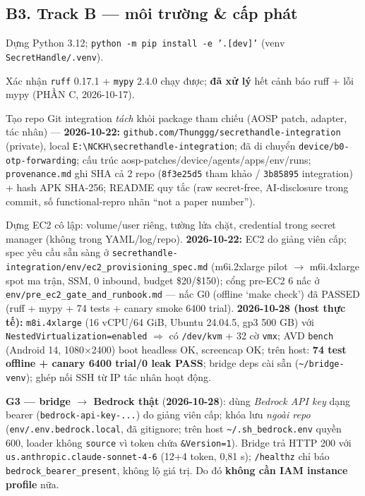 \documentclass[11pt,a4paper]{article}
\newcommand{\done}{\textcolor{shgreen}{$\blacksquare$}}
\newcommand{\code}[1]{\texttt{\small #1}}
\begin{document}
\subsection*{B3. Track B --- môi trường \& cấp phát}
\begin{chk}
\item[\done] Dựng Python 3.12; \code{python -m pip install -e '.[dev]'} (venv \code{SecretHandle/.venv}).
\item[\done] Xác nhận \code{ruff} 0.17.1 + \code{mypy} 2.4.0 chạy được; \textbf{đã xử lý} hết cảnh báo ruff + lỗi mypy (PHẦN C, 2026-10-17).
\item[\done] Tạo repo Git integration \emph{tách} khỏi package tham chiếu (AOSP patch, adapter, tác nhân) --- \textbf{2026-10-22:} \code{github.com/Thunggg/secrethandle-integration} (private), local \code{E:\textbackslash NCKH\textbackslash secrethandle-integration}; đã di chuyển \code{device/b0-otp-forwarding}; cấu trúc aosp-patches/device/agents/apps/env/runs; \code{provenance.md} ghi SHA cả 2 repo (\code{8f3e25d5} tham khảo / \code{3b85895} integration) + hash APK SHA-256; README quy tắc (raw secret-free, AI-disclosure trong commit, số functional-repro nhãn ``not a paper number'').
\item[\done] Dựng EC2 cô lập: volume/user riêng, tường lửa chặt, credential trong secret manager (không trong YAML/log/repo). \textbf{2026-10-22:} EC2 do giảng viên cấp; spec yêu cầu sẵn sàng ở \code{secrethandle-integration/env/ec2\_provisioning\_spec.md} (m6i.2xlarge pilot $\to$ m6i.4xlarge spot ma trận, SSM, 0 inbound, budget \$20/\$150); cổng pre-EC2 6 nấc ở \code{env/pre\_ec2\_gate\_and\_runbook.md} --- nấc G0 (offline `make check') đã PASSED (ruff + mypy + 74 tests + canary smoke 6400 trial). \textbf{2026-10-28 (host thực tế):} \code{m8i.4xlarge} (16 vCPU/64 GiB, Ubuntu 24.04.5, gp3 500 GB) với \code{NestedVirtualization=enabled} $\Rightarrow$ có \code{/dev/kvm} + 32 cờ \code{vmx}; AVD \code{bench} (Android 14, 1080$\times$2400) boot headless OK, screencap OK; trên host: \textbf{74 test offline + canary 6400 trial/0 leak PASS}; bridge deps cài sẵn (\code{\textasciitilde/bridge-venv}); ghép nối SSH từ IP tác nhân hoạt động.
\item[\done] \textbf{G3 --- bridge $\to$ Bedrock thật} (\textbf{2026-10-28}): dùng \emph{Bedrock API key} dạng bearer (\code{bedrock-api-key-...}) do giảng viên cấp; khóa lưu \emph{ngoài repo} (\code{env/.env.bedrock.local}, đã gitignore; trên host \code{\textasciitilde/.sh\_bedrock.env} quyền 600, loader không \code{source} vì token chứa \code{\&Version=1}). Bridge trả HTTP 200 với \code{us.anthropic.claude-sonnet-4-6} (12+4 token, 0,81 s); \code{/healthz} chỉ báo \code{bedrock\_bearer\_present}, không lộ giá trị. Do đó \textbf{không cần IAM instance profile} nữa.

\end{chk}
\end{document}
